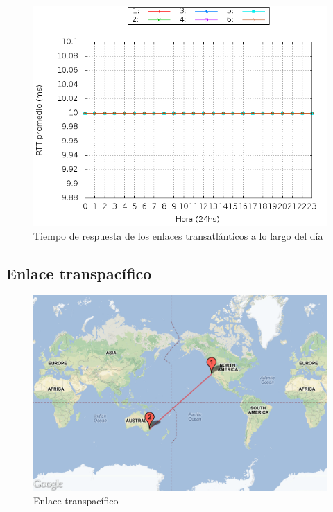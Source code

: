 \begin{figure}[H]
\begin{center}
\includegraphics[width=17cm]{rtts.png}
\end{center}
\caption{Tiempo de respuesta de los enlaces transatlánticos a lo largo del día} \label{figura2}
\end{figure}

\subsection{Enlace transpacífico}

\begin{figure}[H]
\begin{center}
\includegraphics[width=17cm]{enlaceaustralia.png}
\end{center}
\caption{Enlace transpacífico} \label{figura3}
\end{figure}

